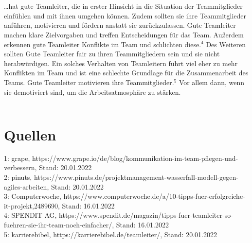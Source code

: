 \documentclass[12pt]{scrartcl}
\begin{document}
	\\ \\
	…hat gute Teamleiter, die in erster Hinsicht in die Situation der Teammitglieder einfühlen und mit ihnen umgehen können. Zudem sollten sie ihre Teammitglieder anführen, motivieren und fördern anstatt sie zurückzulassen. Gute Teamleiter machen klare Zielvorgaben und treffen Entscheidungen für das Team. Außerdem erkennen gute Teamleiter Konflikte im Team und schlichten diese.$^4$ Des Weiteren sollten Gute Teamleiter fair zu ihren Teammitgliedern sein und sie nicht herabwürdigen. Ein solches Verhalten von Teamleitern führt viel eher zu mehr Konflikten im Team und ist eine schlechte Grundlage für die Zusammenarbeit des Teams. Gute Teamleiter motivieren ihre Teammitglieder.$^5$ Vor allem dann, wenn sie demotiviert sind, um die Arbeitsatmosphäre zu stärken.
\\ \\
\section*{Quellen}
	1: grape, https://www.grape.io/de/blog/kommunikation-im-team-pflegen-und-verbessern, Stand: 20.01.2022\\
	2: pinuts, https://www.pinuts.de/projektmanagement-wasserfall-modell-gegen-agiles-arbeiten, Stand: 20.01.2022\\
	3: Computerwoche, https://www.computerwoche.de/a/10-tipps-fuer-erfolgreiche-it-projekt,2489690, Stand: 16.01.2022\\
	4: SPENDIT AG, https://www.spendit.de/magazin/tipps-fuer-teamleiter-so-fuehren-sie-ihr-team-noch-einfacher/, Stand: 16.01.2022\\
	5: karrierebibel, https://karrierebibel.de/teamleiter/, Stand: 20.01.2022
	
	
 
\end{document}

